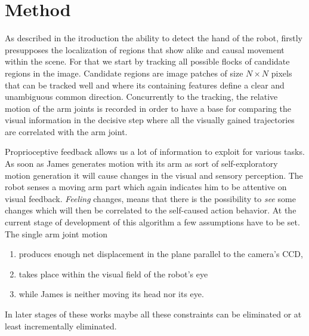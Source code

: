 \section{Method}\label{method}
As described in the itroduction the ability to detect the hand of the robot, 
firstly presupposes the localization of regions that show alike and causal 
movement within the scene. For that we start by tracking all possible flocks 
of candidate regions in the image. Candidate regions are image patches of 
size $N \times N$ pixels that can be tracked well and where its containing 
features define a clear and unambiguous common direction. Concurrently to 
the tracking, the relative motion of the arm joints is recorded in order 
to have a base for comparing the visual information in the decisive step 
where all the visually gained trajectories are correlated with the arm joint. 

Proprioceptive feedback allows us a lot of information to exploit for various 
tasks. As soon as James generates motion with its arm as sort of 
self-exploratory motion generation it will cause changes in the visual and 
sensory perception. The robot senses a moving arm part which again indicates 
him to be attentive on visual feedback. \textit{Feeling} changes, means that 
there is the possibility to \textit{see} some changes which will then be 
correlated to the self-caused action behavior. At the current stage of 
development of this algorithm a few assumptions have to be set. The single 
arm joint motion

\begin{enumerate}
	\item produces enough net displacement in the plane parallel to the camera's CCD,
	\item takes place within the visual field of the robot's eye
	\item while James is neither moving its head nor its eye.
\end{enumerate}
In later stages of these works maybe all these constraints can be eliminated or at least incrementally eliminated.

